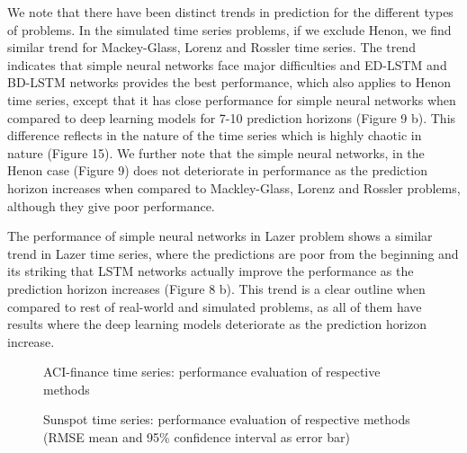 \documentclass[final,5p,times,twocolumn]{elsarticle}
\begin{document}
 We note that there have been distinct trends in prediction for the different types of problems. In the simulated time series problems, if we exclude Henon,  we find similar trend for Mackey-Glass, Lorenz and Rossler time series. The trend indicates  that simple neural networks face major difficulties and ED-LSTM and BD-LSTM networks provides the best performance, which also applies to Henon time series, except that it has close performance for simple neural networks when compared to deep learning models for 7-10  prediction horizons (Figure 9 b). This difference  reflects in the nature of the time series which is  highly chaotic in nature (Figure 15). We further note that the simple neural networks, in the Henon case (Figure 9) does not   deteriorate in performance as the prediction horizon increases when compared to Mackley-Glass, Lorenz and Rossler problems, although they give poor performance.  
 
 The performance of simple neural networks in Lazer problem shows a similar trend in Lazer time series, where the predictions are poor from the beginning and its striking that LSTM networks actually improve the performance as the prediction horizon increases (Figure 8 b). This trend is a clear outline when compared to rest of real-world and simulated problems, as all of them have results where the deep learning models deteriorate as the prediction horizon increase.



\begin{figure*}[htbp!]
\centering
{}
\caption{ACI-finance time series: performance evaluation of respective methods}
\label{fig:finance}
\end{figure*}


\begin{figure*}[htbp!]
\centering
{}
\caption{Sunspot time series: performance evaluation of respective methods (RMSE mean and 95\% confidence interval as error bar)}
\label{fig:sunspot}
\end{figure*}
\end{document}
